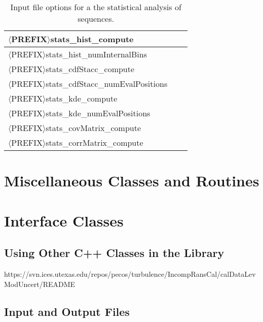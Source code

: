 \begin{table}[!h]
\begin{center}
\begin{tabular}{|l|c|c|}
\hline
\hline
$\langle$PREFIX$\rangle$stats\_hist\_compute              &         &             \\
\hline
$\langle$PREFIX$\rangle$stats\_hist\_numInternalBins      &         &             \\
\hline
\hline
$\langle$PREFIX$\rangle$stats\_cdfStacc\_compute          &         &             \\
\hline
$\langle$PREFIX$\rangle$stats\_cdfStacc\_numEvalPositions &         &             \\
\hline
\hline
$\langle$PREFIX$\rangle$stats\_kde\_compute               &         &             \\
\hline
$\langle$PREFIX$\rangle$stats\_kde\_numEvalPositions      &         &             \\
\hline
\hline
$\langle$PREFIX$\rangle$stats\_covMatrix\_compute         &         &             \\
\hline
$\langle$PREFIX$\rangle$stats\_corrMatrix\_compute        &         &             \\
\hline
\end{tabular}
\end{center}
\caption{
Input file options for a the statistical analysis of sequences.
}
\label{tab-seq-statistical-options}
\end{table}


\section{Miscellaneous Classes and Routines}

\section{Interface Classes}



\subsection{Using Other C++ Classes in the Library}

https://svn.ices.utexas.edu/repos/pecos/turbulence/IncompRansCal/calDataLevModUncert/README


\subsection{Input and Output Files}


